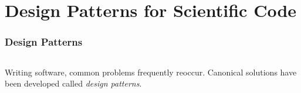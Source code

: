 \documentclass[12pt]{beamer}
\begin{document}






\section{Design Patterns for Scientific Code}

\begin{frame}
  \frametitle{Design Patterns}
  \begin{columns}
    \begin{column}{0.5\textwidth}
      Writing software, common problems frequently reoccur. 
      Canonical solutions have been developed called \textit{design
        patterns}.
      

\end{column}
\end{columns}
\end{frame}
\end{document}
